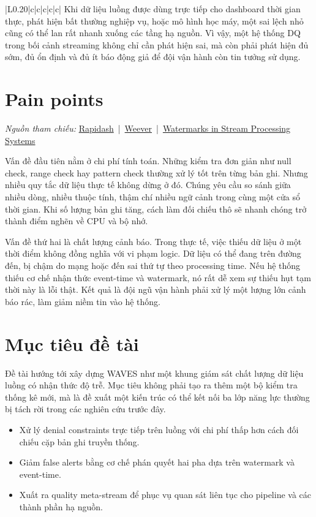 {\begin{longtable}{|L{0.20\textwidth}|c|c|c|c|c|}
Khi dữ liệu luồng được dùng trực tiếp cho dashboard thời gian thực, phát hiện bất thường nghiệp vụ, hoặc mô hình học máy, một sai lệch nhỏ cũng có thể lan rất nhanh xuống các tầng hạ nguồn. Vì vậy, một hệ thống DQ trong bối cảnh streaming không chỉ cần phát hiện sai, mà còn phải phát hiện đủ sớm, đủ ổn định và đủ ít báo động giả để đội vận hành còn tin tưởng sử dụng.

\section{Pain points}

\noindent \textit{Nguồn tham chiếu: }
\href{https://dl.acm.org/doi/10.14778/3659437.3659454}{Rapidash} \,|\, \href{https://dl.acm.org/doi/10.14778/3717755.3717761}{Weever} \,|\, \href{https://dl.acm.org/doi/10.14778/3476311.3476389}{Watermarks in Stream Processing Systems}

Vấn đề đầu tiên nằm ở chi phí tính toán. Những kiểm tra đơn giản như null check, range check hay pattern check thường xử lý tốt trên từng bản ghi. Nhưng nhiều quy tắc dữ liệu thực tế không dừng ở đó. Chúng yêu cầu so sánh giữa nhiều dòng, nhiều thuộc tính, thậm chí nhiều ngữ cảnh trong cùng một cửa sổ thời gian. Khi số lượng bản ghi tăng, cách làm đối chiếu thô sẽ nhanh chóng trở thành điểm nghẽn về CPU và bộ nhớ.

Vấn đề thứ hai là chất lượng cảnh báo. Trong thực tế, việc thiếu dữ liệu ở một thời điểm không đồng nghĩa với vi phạm logic. Dữ liệu có thể đang trên đường đến, bị chậm do mạng hoặc đến sai thứ tự theo processing time. Nếu hệ thống thiếu cơ chế nhận thức event-time và watermark, nó rất dễ xem sự thiếu hụt tạm thời này là lỗi thật. Kết quả là đội ngũ vận hành phải xử lý một lượng lớn cảnh báo rác, làm giảm niềm tin vào hệ thống.

\section{Mục tiêu đề tài}

Đề tài hướng tới xây dựng WAVES như một khung giám sát chất lượng dữ liệu luồng có nhận thức độ trễ. Mục tiêu không phải tạo ra thêm một bộ kiểm tra thống kê mới, mà là đề xuất một kiến trúc có thể kết nối ba lớp năng lực thường bị tách rời trong các nghiên cứu trước đây.

\begin{itemize}
  \item Xử lý denial constraints trực tiếp trên luồng với chi phí thấp hơn cách đối chiếu cặp bản ghi truyền thống.
  \item Giảm false alerts bằng cơ chế phán quyết hai pha dựa trên watermark và event-time.
  \item Xuất ra quality meta-stream để phục vụ quan sát liên tục cho pipeline và các thành phần hạ nguồn.
\end{itemize}


\end{longtable}}
